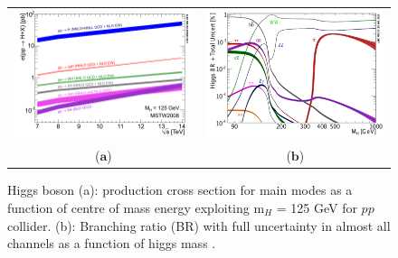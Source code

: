 \begin{figure}[htp]
\centering
\begin{tabular}{cc}
\hspace{-0.3cm}
\includegraphics[scale=0.278]{fig/chapt2/7_14_xsec.png}
& \hspace{-0.5cm} \includegraphics[scale=0.38]{fig/chapt2/Higgs_BR_RECT.png}\\
   ($\mathbf{a}$)\qquad&($\mathbf{b}$)\qquad\\
\end{tabular}
\caption{\label{fig:sm_higgsxsec_BR} Higgs boson (a): production cross section for main modes as a function of centre of mass energy exploiting m$_{H}$ = 125 GeV for $pp$ collider. (b): Branching ratio (BR) with full uncertainty in almost all channels as a function of higgs mass \cite{pub:sm_higgsxsec}.}
\end{figure} 
